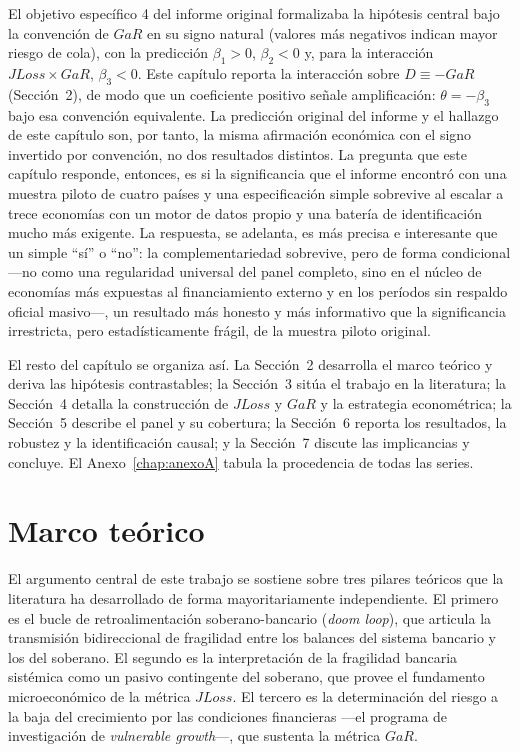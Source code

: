 El objetivo específico 4 del informe original formalizaba la hipótesis central bajo la convención de $GaR$ en su signo natural (valores más negativos indican mayor riesgo de cola), con la predicción $\beta_1>0$, $\beta_2<0$ y, para la interacción $JLoss\times GaR$, $\beta_3<0$. Este capítulo reporta la interacción sobre $D\equiv-GaR$ (Sección~2), de modo que un coeficiente positivo señale amplificación: $\theta=-\beta_3$ bajo esa convención equivalente. La predicción original del informe y el hallazgo de este capítulo son, por tanto, la misma afirmación económica con el signo invertido por convención, no dos resultados distintos. La pregunta que este capítulo responde, entonces, es si la significancia que el informe encontró con una muestra piloto de cuatro países y una especificación simple sobrevive al escalar a trece economías con un motor de datos propio y una batería de identificación mucho más exigente. La respuesta, se adelanta, es más precisa e interesante que un simple ``sí'' o ``no'': la complementariedad sobrevive, pero de forma condicional —no como una regularidad universal del panel completo, sino en el núcleo de economías más expuestas al financiamiento externo y en los períodos sin respaldo oficial masivo—, un resultado más honesto y más informativo que la significancia irrestricta, pero estadísticamente frágil, de la muestra piloto original.

El resto del capítulo se organiza así. La Sección~2 desarrolla el marco teórico y deriva las hipótesis contrastables; la Sección~3 sitúa el trabajo en la literatura; la Sección~4 detalla la construcción de $JLoss$ y $GaR$ y la estrategia econométrica; la Sección~5 describe el panel y su cobertura; la Sección~6 reporta los resultados, la robustez y la identificación causal; y la Sección~7 discute las implicancias y concluye. El Anexo~\ref{chap:anexoA} tabula la procedencia de todas las series.

\section{Marco teórico}

El argumento central de este trabajo se sostiene sobre tres pilares teóricos que la literatura ha desarrollado de forma mayoritariamente independiente. El primero es el bucle de retroalimentación soberano-bancario (\textit{doom loop}), que articula la transmisión bidireccional de fragilidad entre los balances del sistema bancario y los del soberano. El segundo es la interpretación de la fragilidad bancaria sistémica como un pasivo contingente del soberano, que provee el fundamento microeconómico de la métrica $JLoss$. El tercero es la determinación del riesgo a la baja del crecimiento por las condiciones financieras —el programa de investigación de \textit{vulnerable growth}—, que sustenta la métrica $GaR$.

